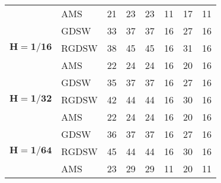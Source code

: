\begin{table}[H]
\begin{tabular}{llrrrrrr}
\cline{2-8}
 & AMS & 21 & {\cellcolor[HTML]{7EAFF1}} \color[HTML]{000000} 23 & {\cellcolor[HTML]{7EAFF1}} \color[HTML]{000000} 23 & {\cellcolor[HTML]{BB9CA9}} \color[HTML]{F1F1F1} 11 & {\cellcolor[HTML]{945357}} \color[HTML]{F1F1F1} 17 & 11 \\
\cline{1-8} \cline{2-8}
\multirow[c]{3}{*}{$\mathbf{H=1/16}$} & GDSW & 33 & {\cellcolor[HTML]{7EAFF1}} \color[HTML]{000000} 37 & {\cellcolor[HTML]{7EAFF1}} \color[HTML]{000000} 37 & {\cellcolor[HTML]{BB9CA9}} \color[HTML]{F1F1F1} 16 & {\cellcolor[HTML]{945357}} \color[HTML]{F1F1F1} 27 & 16 \\
\cline{2-8}
 & RGDSW & 38 & {\cellcolor[HTML]{7EAFF1}} \color[HTML]{000000} 45 & {\cellcolor[HTML]{7EAFF1}} \color[HTML]{000000} 45 & {\cellcolor[HTML]{BB9CA9}} \color[HTML]{F1F1F1} 16 & {\cellcolor[HTML]{945357}} \color[HTML]{F1F1F1} 31 & 16 \\
\cline{2-8}
 & AMS & 22 & {\cellcolor[HTML]{7EAFF1}} \color[HTML]{000000} 24 & {\cellcolor[HTML]{7EAFF1}} \color[HTML]{000000} 24 & {\cellcolor[HTML]{BB9CA9}} \color[HTML]{F1F1F1} 16 & {\cellcolor[HTML]{945357}} \color[HTML]{F1F1F1} 20 & 16 \\
\cline{1-8} \cline{2-8}
\multirow[c]{3}{*}{$\mathbf{H=1/32}$} & GDSW & 35 & {\cellcolor[HTML]{7EAFF1}} \color[HTML]{000000} 37 & {\cellcolor[HTML]{7EAFF1}} \color[HTML]{000000} 37 & {\cellcolor[HTML]{BB9CA9}} \color[HTML]{F1F1F1} 16 & {\cellcolor[HTML]{945357}} \color[HTML]{F1F1F1} 27 & 16 \\
\cline{2-8}
 & RGDSW & 42 & {\cellcolor[HTML]{7EAFF1}} \color[HTML]{000000} 44 & {\cellcolor[HTML]{7EAFF1}} \color[HTML]{000000} 44 & {\cellcolor[HTML]{BB9CA9}} \color[HTML]{F1F1F1} 16 & {\cellcolor[HTML]{945357}} \color[HTML]{F1F1F1} 30 & 16 \\
\cline{2-8}
 & AMS & 22 & {\cellcolor[HTML]{7EAFF1}} \color[HTML]{000000} 24 & {\cellcolor[HTML]{7EAFF1}} \color[HTML]{000000} 24 & {\cellcolor[HTML]{BB9CA9}} \color[HTML]{F1F1F1} 16 & {\cellcolor[HTML]{945357}} \color[HTML]{F1F1F1} 20 & 16 \\
\cline{1-8} \cline{2-8}
\multirow[c]{3}{*}{$\mathbf{H=1/64}$} & GDSW & 36 & {\cellcolor[HTML]{7EAFF1}} \color[HTML]{000000} 37 & {\cellcolor[HTML]{7EAFF1}} \color[HTML]{000000} 37 & {\cellcolor[HTML]{BB9CA9}} \color[HTML]{F1F1F1} 16 & {\cellcolor[HTML]{945357}} \color[HTML]{F1F1F1} 27 & 16 \\
\cline{2-8}
 & RGDSW & 45 & {\cellcolor[HTML]{945357}} \color[HTML]{F1F1F1} 44 & {\cellcolor[HTML]{945357}} \color[HTML]{F1F1F1} 44 & {\cellcolor[HTML]{C8B4C4}} \color[HTML]{000000} 16 & {\cellcolor[HTML]{AE838D}} \color[HTML]{F1F1F1} 30 & 16 \\
\cline{2-8}
 & AMS & 23 & {\cellcolor[HTML]{7EAFF1}} \color[HTML]{000000} 29 & {\cellcolor[HTML]{7EAFF1}} \color[HTML]{000000} 29 & {\cellcolor[HTML]{BB9CA9}} \color[HTML]{F1F1F1} 11 & {\cellcolor[HTML]{945357}} \color[HTML]{F1F1F1} 20 & 11 \\
\cline{1-8} \cline{2-8}
\bottomrule
\end{tabular}
\end{table}
